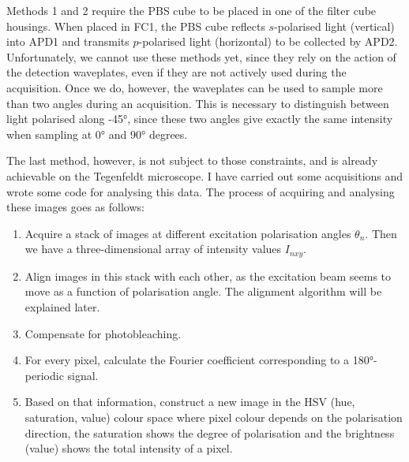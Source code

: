 Methods 1 and 2 require the PBS cube to be placed in one of the filter cube housings. When placed in FC1, the PBS cube reflects $ s $-polarised light (vertical) into APD1 and transmits $ p $-polarised light (horizontal) to be collected by APD2. Unfortunately, we cannot use these methods yet, since they rely on the action of the detection waveplates, even if they are not actively used during the acquisition. Once we do, however, the waveplates can be used to sample more than two angles during an acquisition. This is necessary to distinguish between light polarised along \ang{+-45}, since these two angles give exactly the same intensity when sampling at \ang{0} and \ang{90} degrees.

The last method, however, is not subject to those constraints, and is already achievable on the Tegenfeldt microscope. I have carried out some acquisitions and wrote some code for analysing this data. The process of acquiring and analysing these images goes as follows:
\begin{enumerate}
	\item Acquire a stack of images at different excitation polarisation angles $ \theta_n $. Then we have a three-dimensional array of intensity values $ I_{nxy} $.
	\item Align images in this stack with each other, as the excitation beam seems to move as a function of polarisation angle. The alignment algorithm will be explained later.
	\item Compensate for photobleaching.
	\item For every pixel, calculate the Fourier coefficient corresponding to a \ang{180}-periodic signal.
	\item Based on that information, construct a new image in the HSV (hue, saturation, value) colour space where pixel colour depends on the polarisation direction, the saturation shows the degree of polarisation and the brightness (value) shows the total intensity of a pixel. 

\end{enumerate}

